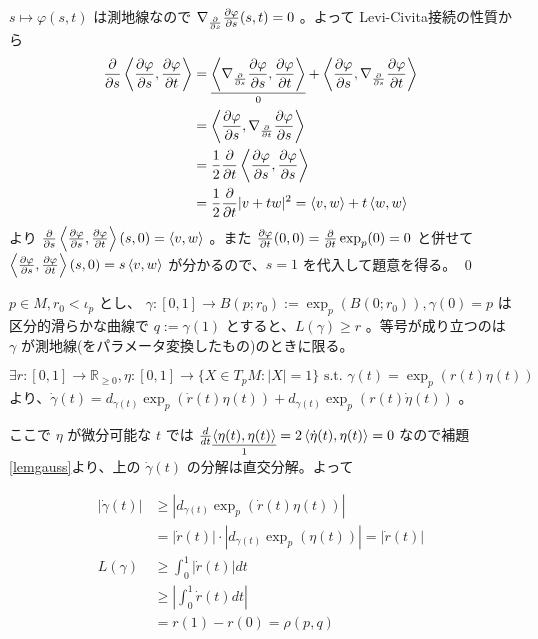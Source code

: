 \documentclass[dvipdfmx,a4paper]{jsreport}
\theoremstyle{definition}
\newcommand{\der}{\partial}
\renewcommand{\phi}{\varphi}
\begin{document}
$s \mapsto \phi(s,t)$ は測地線なので $\nabla_{\der \over \der s}{\der \phi \over \der s}(s,t)=0$ 。よって Levi-Civita接続の性質から
\begin{align*}
    {\der \over \der s} \ev{{\der \phi \over \der s},{\der \phi \over \der t}} &= \underset{0}{\underline{\ev{\nabla_{{\der \over \der s}}{\der \phi \over \der s},{\der \phi \over \der t}}}}+\ev{{\der \phi \over \der s},\nabla_{{\der \over \der s}}{\der \phi \over \der t}} \\
    &= \ev{{\der \phi \over \der s},\nabla_{{\der \over \der t}}{\der \phi \over \der s}} \\
    &= {1 \over 2}{\der \over \der t}\ev{{\der \phi \over \der s},{\der \phi \over \der s}} \\
    &= {1 \over 2}{\der \over \der t}|v+tw|^2 = \ev{v,w}+t\ev{w,w}
\end{align*}
より ${\der \over \der s} \ev{{\der \phi \over \der s},{\der \phi \over \der t}}(s,0)=\ev{v,w}$ 。また ${\der \phi \over \der t}(0,0)={\der \over \der t}\exp_p(0)=0$ と併せて $\ev{{\der \phi \over \der s},{\der \phi \over \der t}}(s,0)=s\ev{v,w}$ が分かるので、$s=1$ を代入して題意を得る。 \qed


\prop\label{propmin} $p \in M,r_0 <\iota_p$ とし、 $\gamma:[0,1] \to B(p;r_0):=\exp_p(B(0;r_0)),\gamma(0)=p$ は区分的滑らかな曲線で $q:=\gamma(1)$ とすると、$L(\gamma) \geq r$ 。等号が成り立つのは $\gamma$ が測地線(をパラメータ変換したもの)のときに限る。

\prf $\exists r:[0,1] \to \mathbb{R}_{\geq 0},\eta:[0,1] \to \{X \in T_pM \colon |X|=1\}\mbox{ s.t. }\gamma(t)=\exp_p(r(t)\eta(t))$ より、$\dot{\gamma}(t)=d_{\gamma(t)}\exp_p(\dot{r}(t)\eta(t))+d_{\gamma(t)}\exp_p(r(t)\dot{\eta}(t))$ 。

ここで $\eta$ が微分可能な $t$ では ${d \over dt}\underset{1}{\underline{\ev{\eta(t),\eta(t)}}}=2\ev{\dot{\eta}(t),\eta(t)}=0$ なので補題\ref{lemgauss}より、上の $\dot{\gamma}(t)$ の分解は直交分解。よって

\begin{align*}
    |\dot{\gamma}(t)| &\geq |d_{\gamma(t)}\exp_p(\dot{r}(t)\eta(t))| \\
    &=|\dot{r}(t)| \cdot |d_{\gamma(t)}\exp_p(\eta(t))| =|\dot{r}(t)| \\
    L(\gamma) &\geq \int_{0}^1 |\dot{r}(t)| dt \\
    &\geq |\int_{0}^1 \dot{r}(t) dt| \\
    &= r(1)-r(0)=\rho(p,q)
\end{align*}
\end{document}
